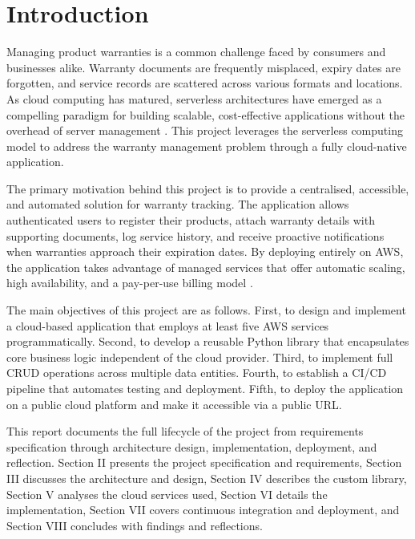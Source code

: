 \documentclass[conference]{IEEEtran}
\begin{document}
\section{Introduction}

Managing product warranties is a common challenge faced by consumers and businesses alike. Warranty documents are frequently misplaced, expiry dates are forgotten, and service records are scattered across various formats and locations. As cloud computing has matured, serverless architectures have emerged as a compelling paradigm for building scalable, cost-effective applications without the overhead of server management \cite{jonas2019cloud}. This project leverages the serverless computing model to address the warranty management problem through a fully cloud-native application.

The primary motivation behind this project is to provide a centralised, accessible, and automated solution for warranty tracking. The application allows authenticated users to register their products, attach warranty details with supporting documents, log service history, and receive proactive notifications when warranties approach their expiration dates. By deploying entirely on AWS, the application takes advantage of managed services that offer automatic scaling, high availability, and a pay-per-use billing model \cite{awswell2023}.

The main objectives of this project are as follows. First, to design and implement a cloud-based application that employs at least five AWS services programmatically. Second, to develop a reusable Python library that encapsulates core business logic independent of the cloud provider. Third, to implement full CRUD operations across multiple data entities. Fourth, to establish a CI/CD pipeline that automates testing and deployment. Fifth, to deploy the application on a public cloud platform and make it accessible via a public URL.

This report documents the full lifecycle of the project from requirements specification through architecture design, implementation, deployment, and reflection. Section II presents the project specification and requirements, Section III discusses the architecture and design, Section IV describes the custom library, Section V analyses the cloud services used, Section VI details the implementation, Section VII covers continuous integration and deployment, and Section VIII concludes with findings and reflections.
\end{document}
